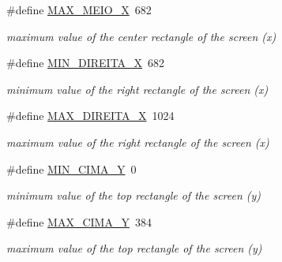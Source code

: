 \begin{DoxyCompactItemize}
\mbox{\label{group___project_gaf2951cc1a396309759ae497a7f8db1e4}} 
\#define \hyperlink{group___project_gaf2951cc1a396309759ae497a7f8db1e4}{M\+A\+X\+\_\+\+M\+E\+I\+O\+\_\+X}~682
\begin{DoxyCompactList}\small\item\em maximum value of the center rectangle of the screen (x) \end{DoxyCompactList}\item 
\mbox{\label{group___project_ga2229ca24bc122bd9408689734320d096}} 
\#define \hyperlink{group___project_ga2229ca24bc122bd9408689734320d096}{M\+I\+N\+\_\+\+D\+I\+R\+E\+I\+T\+A\+\_\+X}~682
\begin{DoxyCompactList}\small\item\em minimum value of the right rectangle of the screen (x) \end{DoxyCompactList}\item 
\mbox{\label{group___project_ga0ea90e9c0e7cf279489dcb13ab3d8212}} 
\#define \hyperlink{group___project_ga0ea90e9c0e7cf279489dcb13ab3d8212}{M\+A\+X\+\_\+\+D\+I\+R\+E\+I\+T\+A\+\_\+X}~1024
\begin{DoxyCompactList}\small\item\em maximum value of the right rectangle of the screen (x) \end{DoxyCompactList}\item 
\mbox{\label{group___project_gaf8aa68539c964feec74431936d6eaaa9}} 
\#define \hyperlink{group___project_gaf8aa68539c964feec74431936d6eaaa9}{M\+I\+N\+\_\+\+C\+I\+M\+A\+\_\+Y}~0
\begin{DoxyCompactList}\small\item\em minimum value of the top rectangle of the screen (y) \end{DoxyCompactList}\item 
\mbox{\label{group___project_ga2e63ec1e993006b487719d1e8d6f87e2}} 
\#define \hyperlink{group___project_ga2e63ec1e993006b487719d1e8d6f87e2}{M\+A\+X\+\_\+\+C\+I\+M\+A\+\_\+Y}~384
\begin{DoxyCompactList}\small\item\em maximum value of the top rectangle of the screen (y) \end{DoxyCompactList}\item 

\end{DoxyCompactItemize}
